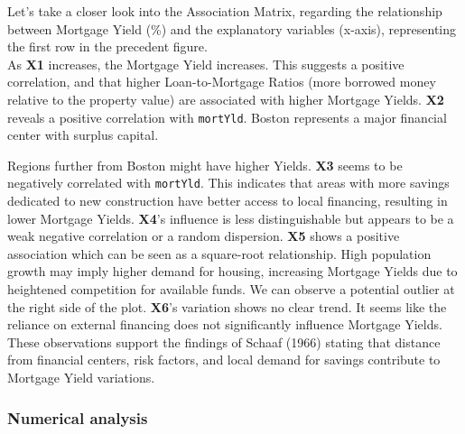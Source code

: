 \documentclass[
  12pt,
]{article}
\begin{document}
Let's take a closer look into the Association Matrix, regarding the
relationship between Mortgage Yield (\%) and the explanatory variables
(x-axis), representing the first row in the precedent figure.\\

As \textbf{X1} increases, the Mortgage Yield increases. This suggests a
positive correlation, and that higher Loan-to-Mortgage Ratios (more
borrowed money relative to the property value) are associated with
higher Mortgage Yields. \textbf{X2} reveals a positive correlation with
\texttt{mortYld}. Boston represents a major financial center with
surplus capital.

Regions further from Boston might have higher Yields. \textbf{X3} seems
to be negatively correlated with \texttt{mortYld}. This indicates that
areas with more savings dedicated to new construction have better access
to local financing, resulting in lower Mortgage Yields. \textbf{X4}'s
influence is less distinguishable but appears to be a weak negative
correlation or a random dispersion. \textbf{X5} shows a positive
association which can be seen as a square-root relationship. High
population growth may imply higher demand for housing, increasing
Mortgage Yields due to heightened competition for available funds. We
can observe a potential outlier at the right side of the plot.
\textbf{X6}'s variation shows no clear trend. It seems like the reliance
on external financing does not significantly influence Mortgage
Yields.\\
These observations support the findings of Schaaf (1966) stating that
distance from financial centers, risk factors, and local demand for
savings contribute to Mortgage Yield variations. \vspace{-3pt}

\subsubsection{Numerical analysis}\label{numerical-analysis-1}
\end{document}
